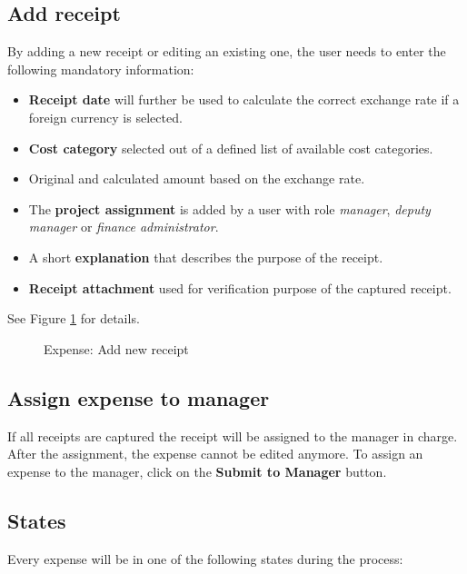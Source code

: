 \subsection{Add receipt}
\label{sec:addreceipt}
By adding a new receipt or editing an existing one, the user needs to enter the following mandatory information:  
\begin{itemize}
    \item \textbf{Receipt date} will further be used to calculate the correct exchange rate if a foreign currency is selected.  
    \item \textbf{Cost category} selected out of a defined list of available cost categories.
    \item Original and calculated amount based on the exchange rate.
    \item The \textbf{project assignment} is added by a user with role \textit{manager}, \textit{deputy manager} or \textit{finance administrator}.
    \item A short \textbf{explanation} that describes the purpose of the receipt.   
    \item \textbf{Receipt attachment} used for verification purpose of the captured receipt. 
\end{itemize}

See Figure \ref{fig:expenses-add01} for details.


\begin{figure}[H]
    \centering
    \caption{Expense: Add new receipt}
    \label{fig:expenses-add01}
\end{figure}

\subsection{Assign expense to manager}
If all receipts are captured the receipt will be assigned to the manager in charge. After the assignment, the expense cannot be edited anymore. To assign an expense to the manager, click on the \textbf{Submit to Manager} button.

\subsection{States}
Every expense will be in one of the following states during the process:

